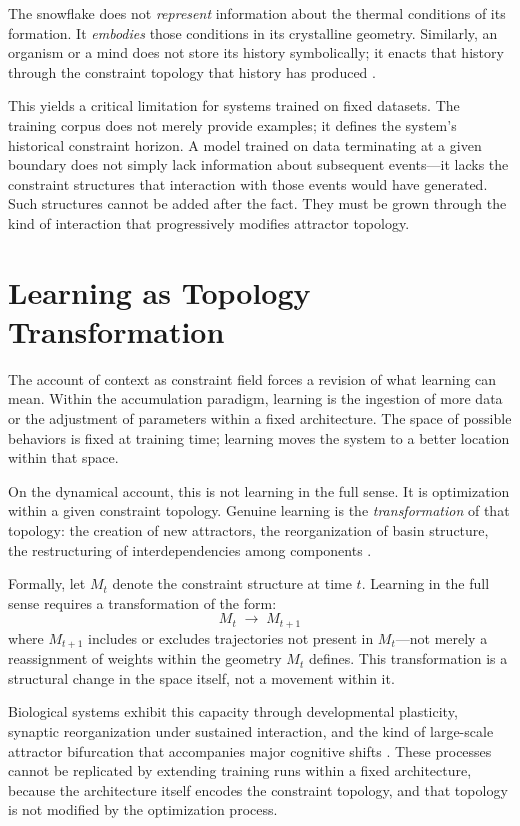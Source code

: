 \documentclass[11pt]{article}
\begin{document}
The snowflake does not \emph{represent} information about the thermal conditions of its
formation. It \emph{embodies} those conditions in its crystalline geometry. Similarly,
an organism or a mind does not store its history symbolically; it enacts that history
through the constraint topology that history has produced \citep{deacon2012}.

This yields a critical limitation for systems trained on fixed datasets. The training
corpus does not merely provide examples; it defines the system's historical constraint
horizon. A model trained on data terminating at a given boundary does not simply lack
information about subsequent events—it lacks the constraint structures that interaction
with those events would have generated. Such structures cannot be added after the fact.
They must be grown through the kind of interaction that progressively modifies attractor
topology.

\section{Learning as Topology Transformation}

The account of context as constraint field forces a revision of what learning can mean.
Within the accumulation paradigm, learning is the ingestion of more data or the adjustment
of parameters within a fixed architecture. The space of possible behaviors is fixed at
training time; learning moves the system to a better location within that space.

On the dynamical account, this is not learning in the full sense. It is optimization
within a given constraint topology. Genuine learning is the \emph{transformation} of that
topology: the creation of new attractors, the reorganization of basin structure, the
restructuring of interdependencies among components \citep{kauffman1993,beer2000}.

Formally, let $M_t$ denote the constraint structure at time $t$. Learning in the full
sense requires a transformation of the form:
\[
M_t \;\longrightarrow\; M_{t+1}
\]
where $M_{t+1}$ includes or excludes trajectories not present in $M_t$—not merely a
reassignment of weights within the geometry $M_t$ defines. This transformation is a
structural change in the space itself, not a movement within it.

Biological systems exhibit this capacity through developmental plasticity, synaptic
reorganization under sustained interaction, and the kind of large-scale attractor
bifurcation that accompanies major cognitive shifts \citep{kelso1995,thelen1994}. These
processes cannot be replicated by extending training runs within a fixed architecture,
because the architecture itself encodes the constraint topology, and that topology is not
modified by the optimization process.
\end{document}
